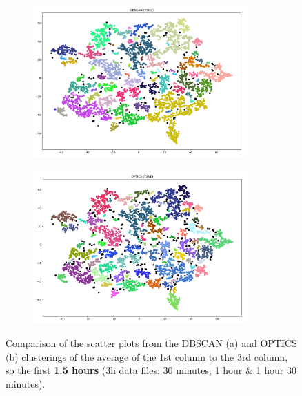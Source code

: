 \begin{figure}[H]
	\centering
	\begin{subfigure}{.5\textwidth}
    \centering
    \includegraphics[width=0.9\textwidth]{./images/clusteringResults/3h-3-DBSCAN.png}
  \end{subfigure}%
  \begin{subfigure}{.5\textwidth}
    \centering
    \includegraphics[width=0.9\textwidth]{./images/clusteringResults/3h-3-OPTICS.png}
	\end{subfigure}
	\caption{Comparison of the scatter plots from the DBSCAN (a) and OPTICS (b) clusterings of the average of the 1st column to the 3rd column, so the first \textbf{1.5 hours} (3h data files: 30 minutes, 1 hour \& 1 hour 30 minutes).}
  \label{figure:finalClustering3h-3}
\end{figure}

